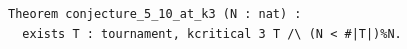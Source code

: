 \begin{lstlisting}[language=Rocq]
Theorem conjecture_5_10_at_k3 (N : nat) :
  exists T : tournament, kcritical 3 T /\ (N < #|T|)%N.
\end{lstlisting}
